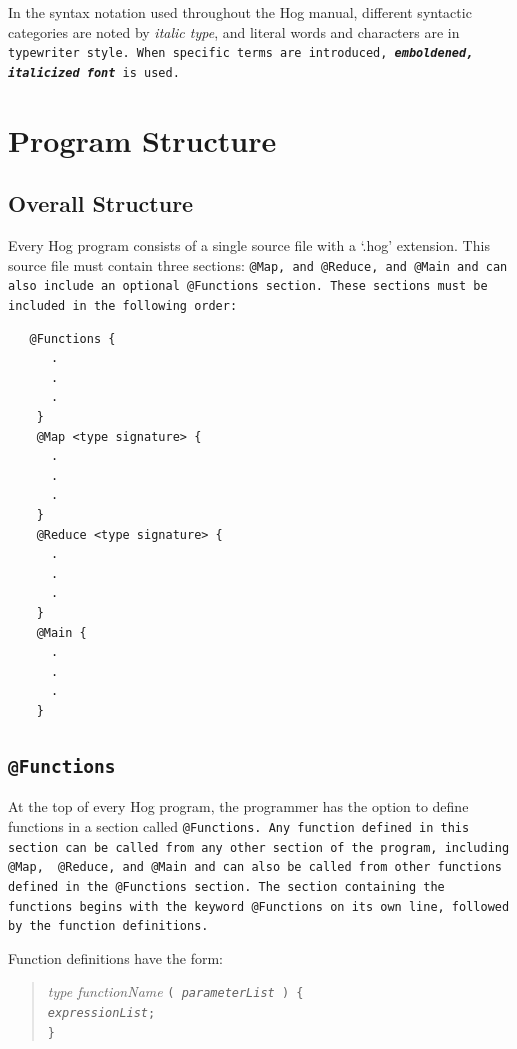 \documentclass{report}
\begin{document}
In the syntax notation used throughout the Hog manual, different syntactic
categories are noted by \emph{italic type}, and literal words and characters
are in \tt typewriter style\rm. When specific terms are introduced,
\textbf{\emph{emboldened, italicized font}} is used.


\section{Program Structure} %
\label{sec:program_structure}

\subsection{Overall Structure} %
\label{sub:overall_structure}

Every Hog program consists of a single source file with a ‘.hog’ extension. This
source file must contain three sections: \tt @Map\rm, and \tt @Reduce\rm, and
\tt @Main \rm and can also include an optional \tt @Functions \rm section. These
sections must be included in the following order:

\begin{verbatim}
   @Functions {
      .
      .
      .
    }
    @Map <type signature> {
      .
      .
      .
    }
    @Reduce <type signature> {
      .
      .
      .
    }
    @Main {
      .
      .
      .
    }
\end{verbatim}


\subsection{\tt @Functions\rm} %
\label{sub:tt_functionsrm}

At the top of every Hog program, the programmer has the option to define functions
in a section called \tt @Functions\rm. Any function defined in this section can be
called from any other section of the program, including \tt @Map\rm, \tt
@Reduce\rm, and \tt @Main \rm and can also be called from other functions defined
in the \tt @Functions \rm section. The section containing the functions begins
with the keyword \tt @Functions \rm on its own line, followed by the function
definitions.

Function definitions have the form:

\begin{quotation}
  \emph{type functionName} \tt ( \rm \emph{parameterList} \tt ) \{ \rm \\
  \indent \indent \emph{expressionList}; \\
  \indent \tt \}
\end{quotation}
\end{document}

